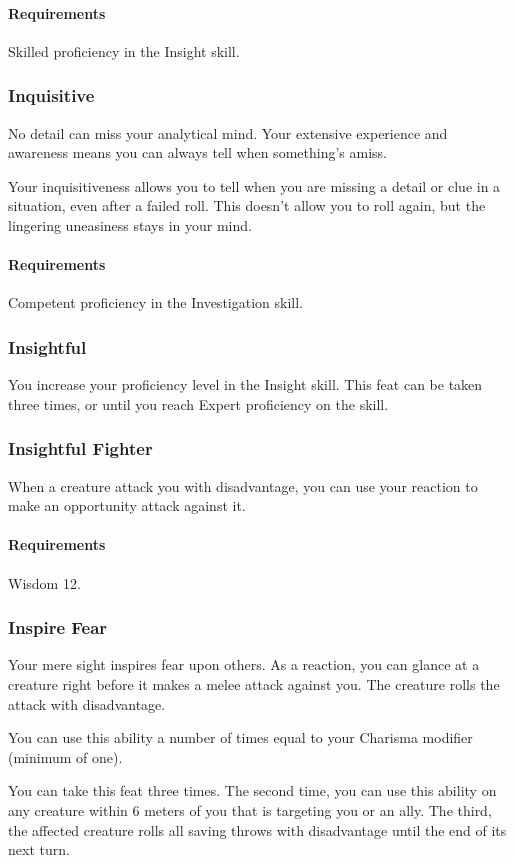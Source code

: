     \paragraph{Requirements} Skilled proficiency in the Insight skill.
\subsubsection{Inquisitive} \label{feat::inquisitive}
    No detail can miss your analytical mind.
    Your extensive experience and awareness means you can always tell when something's amiss.

    Your inquisitiveness allows you to tell when you are missing a detail or clue in a situation, even after a failed roll.
    This doesn't allow you to roll again, but the lingering uneasiness stays in your mind.
    \paragraph{Requirements} Competent proficiency in the Investigation skill.
\subsubsection{Insightful} \label{feat::insightful}
    You increase your proficiency level in the Insight skill.
    This feat can be taken three times, or until you reach Expert proficiency on the skill.
\subsubsection{Insightful Fighter} \label{feat::insightfulfighter}
    When a creature attack you with disadvantage, you can use your reaction to make an opportunity attack against it.
    \paragraph{Requirements} Wisdom 12.
\subsubsection{Inspire Fear} \label{feat::inspirefear}
    Your mere sight inspires fear upon others.
    As a reaction, you can glance at a creature right before it makes a melee attack against you.
    The creature rolls the attack with disadvantage.

    You can use this ability a number of times equal to your Charisma modifier (minimum of one).

    You can take this feat three times.
    The second time, you can use this ability on any creature within 6 meters of you that is targeting you or an ally.
    The third, the affected creature rolls all saving throws with disadvantage until the end of its next turn.
